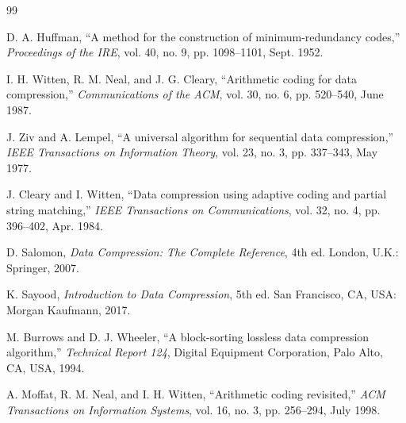 \documentclass[conference]{IEEEtran}
\begin{document}
\begin{thebibliography}{99}

D. A. Huffman, ``A method for the construction of minimum-redundancy codes,'' \textit{Proceedings of the IRE}, vol. 40, no. 9, pp. 1098--1101, Sept. 1952.

I. H. Witten, R. M. Neal, and J. G. Cleary, ``Arithmetic coding for data compression,'' \textit{Communications of the ACM}, vol. 30, no. 6, pp. 520--540, June 1987.

J. Ziv and A. Lempel, ``A universal algorithm for sequential data compression,'' \textit{IEEE Transactions on Information Theory}, vol. 23, no. 3, pp. 337--343, May 1977.

J. Cleary and I. Witten, ``Data compression using adaptive coding and partial string matching,'' \textit{IEEE Transactions on Communications}, vol. 32, no. 4, pp. 396--402, Apr. 1984.

D. Salomon, \textit{Data Compression: The Complete Reference}, 4th ed. London, U.K.: Springer, 2007.

K. Sayood, \textit{Introduction to Data Compression}, 5th ed. San Francisco, CA, USA: Morgan Kaufmann, 2017.

M. Burrows and D. J. Wheeler, ``A block-sorting lossless data compression algorithm,'' \textit{Technical Report 124}, Digital Equipment Corporation, Palo Alto, CA, USA, 1994.

A. Moffat, R. M. Neal, and I. H. Witten, ``Arithmetic coding revisited,'' \textit{ACM Transactions on Information Systems}, vol. 16, no. 3, pp. 256--294, July 1998.

\end{thebibliography}
\end{document}
